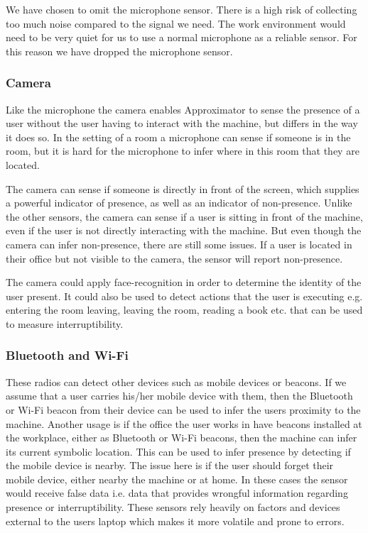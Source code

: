 \documentclass{sigchi}
\begin{document}
We have chosen to omit the microphone sensor.
There is a high risk of collecting too much noise compared to the signal we need.
The work environment would need to be very quiet for us to use a normal microphone as a reliable sensor.
For this reason we have dropped the microphone sensor.

\subsubsection{Camera}
Like the microphone the camera enables Approximator to sense the presence of a user without the user having to interact with the machine, but differs in the way it does so.
In the setting of a room a microphone can sense if someone is in the room, but it is hard for the microphone to infer where in this room that they are located.

The camera can sense if someone is directly in front of the screen, which supplies a powerful indicator of presence, as well as an indicator of non-presence.
Unlike the other sensors, the camera can sense if a user is sitting in front of the machine, even if the user is not directly interacting with the machine.
But even though the camera can infer non-presence, there are still some issues.
If a user is located in their office but not visible to the camera, the sensor will report non-presence.

The camera could apply face-recognition in order to determine the identity of the user present.
It could also be used to detect actions that the user is executing e.g. entering the room leaving, leaving the room, reading a book etc. that can be used to measure interruptibility.

\subsubsection{Bluetooth and Wi-Fi}
These radios can detect other devices such as mobile devices or beacons.
If we assume that a user carries his/her mobile device with them, then the Bluetooth or Wi-Fi beacon from their device can be used to infer the users proximity to the machine.
Another usage is if the office the user works in have beacons installed at the workplace, either as Bluetooth or Wi-Fi beacons, then the machine can infer its current symbolic location.
This can be used to infer presence by detecting if the mobile device is nearby.
The issue here is if the user should forget their mobile device, either nearby the machine or at home.
In these cases the sensor would receive false data i.e. data that provides wrongful information regarding presence or interruptibility.
These sensors rely heavily on factors and devices external to the users laptop which makes it more volatile and prone to errors.
\end{document}
